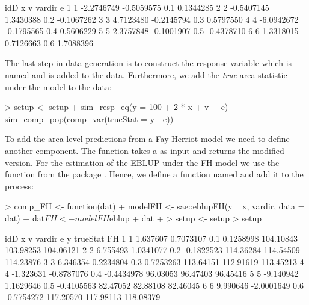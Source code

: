 \documentclass[article]{ajs}
\begin{document}
\begin{Schunk}
\begin{Soutput}
  idD          x          v vardir          e
1   1 -2.2746749 -0.5059575    0.1  0.1344285
2   2 -0.5407145  1.3430388    0.2 -0.1067262
3   3  4.7123480 -0.2145794    0.3  0.5797550
4   4 -6.0942672 -0.1795565    0.4  0.5606229
5   5  2.3757848 -0.1001907    0.5 -0.4378710
6   6  1.3318015  0.7126663    0.6  1.7088396
\end{Soutput}
\end{Schunk}

The last step in data generation is to construct the response variable which is named  and is added to the data. Furthermore, we add the \textit{true} area statistic under the model to the data:

\begin{Schunk}
\begin{Sinput}
> setup <- setup %
+   sim_resp_eq(y = 100 + 2 * x + v + e) %
+   sim_comp_pop(comp_var(trueStat = y - e))
\end{Sinput}
\end{Schunk}

To add the area-level predictions from a Fay-Herriot model we need to define another component. The function takes a  as input and returns the modified version. For the estimation of the EBLUP under the FH model we use the function  from the package  \citep{molina13}. Hence, we define a function named  and add it to the process:

\begin{Schunk}
\begin{Sinput}
> comp_FH <- function(dat) {
+   modelFH <- sae::eblupFH(y ~ x, vardir, data = dat)
+   dat$FH <- modelFH$eblup
+   dat
+ }
> setup <- setup %
> setup
\end{Sinput}
\begin{Soutput}
  idD         x          v vardir          e         y  trueStat        FH
1   1  1.637607  0.7073107    0.1  0.1258998 104.10843 103.98253 104.06121
2   2  6.755493  1.0341077    0.2 -0.1822523 114.36284 114.54509 114.23876
3   3  6.346354  0.2234804    0.3  0.7253263 113.64151 112.91619 113.45213
4   4 -1.323631 -0.8787076    0.4 -0.4434978  96.03053  96.47403  96.45416
5   5 -9.140942  1.1629646    0.5 -0.4105563  82.47052  82.88108  82.46045
6   6  9.990646 -2.0001649    0.6 -0.7754272 117.20570 117.98113 118.08379
\end{Soutput}
\end{Schunk}
\end{document}
